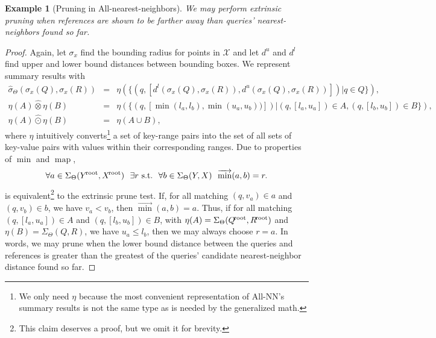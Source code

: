 \documentclass{article}
\newtheorem{example} {Example}
\newcommand{\killspace}{\vspace{-0.08in}}
\newcommand{\GNP}[1][\psi]{{#1}_{\Theta}}
\newcommand{\sigmahat}{\mathbin{\widehat{\sigma}}}
\newcommand{\otimeshat}{\mathbin{\widehat{\otimes}}}
\newcommand{\odothat}{\mathbin{\widehat{\odot}}}
\DeclareMathOperator*{\map}{map}
\newcommand{\st}{{\rm~s.t.~}}
\newcommand{\disthrectmin}{d^{l}}
\newcommand{\disthrectmax}{d^{u}}
\newcommand{\kdroot}[1]{#1^{\!\text{\rm root}}}
\newcommand{\kdleft}[1]{#1^{\!L}}
\newcommand{\kdright}[1]{#1^{\!R}}
\begin{document}
\begin{example}[Pruning in All-nearest-neighbors]
  We may perform extrinsic pruning when references are shown to be
  farther away than queries' nearest-neighbors found so far.
\end{example}
\killspace
\begin{proof}
  Again, let $\sigma_x$ find the bounding radius for points in $\mathcal{X}$ and let $\disthrectmax$ and $\disthrectmin$ find upper and lower bound distances between bounding boxes.
  We represent summary results with
  \begin{eqnarray*}
    \GNP[\sigmahat](\sigma_x(Q),\sigma_x(R)) & = & \eta(\{(q,[\disthrectmin(\sigma_x(Q),\sigma_x(R)), \disthrectmax(\sigma_x(Q),\sigma_x(R))]) | q \in Q\}), \\
    \eta(A) \otimeshat \eta(B) & = & \eta(\{(q,[\min(l_a,l_b),\min(u_a,u_b))]) | (q,[l_a,u_a]) \in A, (q,[l_b,u_b]) \in B\}), \\
    \eta(A) \odothat \eta(B) & = & \eta(A \cup B),
  \end{eqnarray*}
  where $\eta$ intuitively converts\footnote{We only need $\eta$
  because the most convenient representation of All-NN's summary
  results is not the same type as is needed by the generalized math.}
  a set of key-range pairs into the set of all sets of key-value pairs
  with values within their corresponding ranges.  Due to properties of
  $\min$ and $\map$,
  \[
  \forall a \in \GNP[\Sigma](\kdroot{Y},\kdroot{X})~~ \exists r \st~ \forall b \in \GNP[\Sigma](Y,X)~~ \overrightarrow{\min}(a,b) = r.
  \]
  is equivalent\footnote{This claim deserves a proof, but we omit it
  for brevity.} to the extrinsic prune test.  If, for all matching
  $(q,v_a) \in a$ and $(q,v_b) \in b$, we have $v_a < v_b$, then
  $\overrightarrow{\min}(a,b) = a$.  Thus, if for all matching
  $(q,[l_a,u_a]) \in A$ and $(q,[l_b,u_b]) \in B$, with $\eta(A) =
  \GNP[\Sigma](\kdroot{Q},\kdroot{R})$ and $\eta(B) = \GNP[\Sigma](Q,R)$,
  we have $u_a \leq l_b$, then we may always choose $r = a$.  In
  words, we may prune when the lower bound distance between the
  queries and references is greater than the greatest of the queries'
  candidate nearest-neighbor distance found so far.
\end{proof}
\end{document}
